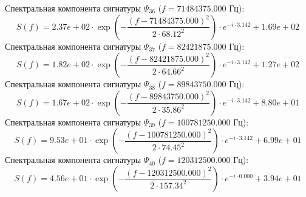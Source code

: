 \documentclass[11pt,twocolumn]{article}
\begin{document}
Спектральная компонента сигнатуры $\Psi_{36}$ ($f = 71484375.000$ Гц):
\begin{equation}
S(f) = 2.37e+02 \cdot \exp\left( -\frac{(f - 71484375.000)^2}{2 \cdot 68.12^2} \right) \cdot e^{-i \cdot 3.142} + 1.69e+02
\end{equation}
Спектральная компонента сигнатуры $\Psi_{37}$ ($f = 82421875.000$ Гц):
\begin{equation}
S(f) = 1.82e+02 \cdot \exp\left( -\frac{(f - 82421875.000)^2}{2 \cdot 64.66^2} \right) \cdot e^{-i \cdot 3.142} + 1.27e+02
\end{equation}
Спектральная компонента сигнатуры $\Psi_{38}$ ($f = 89843750.000$ Гц):
\begin{equation}
S(f) = 1.67e+02 \cdot \exp\left( -\frac{(f - 89843750.000)^2}{2 \cdot 35.86^2} \right) \cdot e^{-i \cdot 3.142} + 8.80e+01
\end{equation}
Спектральная компонента сигнатуры $\Psi_{39}$ ($f = 100781250.000$ Гц):
\begin{equation}
S(f) = 9.53e+01 \cdot \exp\left( -\frac{(f - 100781250.000)^2}{2 \cdot 74.45^2} \right) \cdot e^{-i \cdot 3.142} + 6.99e+01
\end{equation}
Спектральная компонента сигнатуры $\Psi_{40}$ ($f = 120312500.000$ Гц):
\begin{equation}
S(f) = 4.56e+01 \cdot \exp\left( -\frac{(f - 120312500.000)^2}{2 \cdot 157.34^2} \right) \cdot e^{-i \cdot 0.000} + 3.94e+01
\end{equation}
\end{document}
